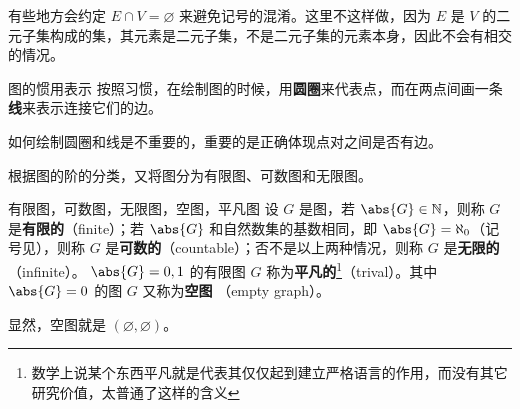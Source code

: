 有些地方会约定 $E\cap V=\varnothing$ 来避免记号的混淆。这里不这样做，因为 $E$ 是 $V$ 的二元子集构成的集，其元素是二元子集，不是二元子集的元素本身，因此不会有相交的情况。

\begin{definition}{图的惯用表示}
按照习惯，在绘制图的时候，用\textbf{圆圈}来代表点，而在两点间画一条\textbf{线}来表示连接它们的边。
\end{definition}
如何绘制圆圈和线是不重要的，重要的是正确体现点对之间是否有边。

根据图的阶的分类，又将图分为有限图、可数图和无限图。
\begin{definition}{有限图，可数图，无限图，空图，平凡图}
设 $G$ 是图，若 $\abs{G}\in\mathbb N$，则称 $G$ 是\textbf{有限的}（finite）；若 $\abs{G}$ 和自然数集的基数相同，即 $\abs{G}=\aleph_0$（记号见），则称 $G$ 是\textbf{可数的}（countable）；否不是以上两种情况，则称 $G$ 是\textbf{无限的}（infinite）。 $\abs{G}=0,1$ 的有限图 $G$ 称为\textbf{平凡的}\footnote{数学上说某个东西平凡就是代表其仅仅起到建立严格语言的作用，而没有其它研究价值，太普通了这样的含义}（trival）。其中 $\abs{G}=0$ 的图 $G$ 又称为\textbf{空图} （empty graph）。 
\end{definition}
显然，空图就是 $(\varnothing,\varnothing)$。



